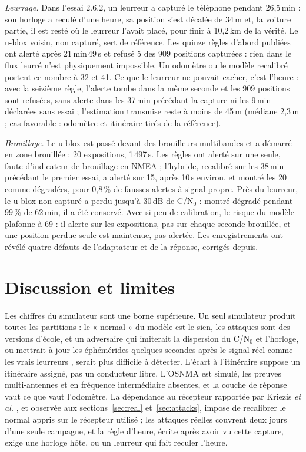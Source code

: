 \documentclass[conference]{IEEEtran}
\begin{document}
\emph{Leurrage.} Dans l'essai 2.6.2, un leurreur a capturé le téléphone pendant 26,5\,min : son horloge a reculé d'une heure, sa position s'est décalée de 34\,m et, la voiture partie, il est resté où le leurreur l'avait placé, pour finir à 10,2\,km de la vérité. Le u-blox voisin, non capturé, sert de référence. Les quinze règles d'abord publiées ont alerté après 21\,min\,49\,s et refusé 5 des 909 positions capturées : rien dans le flux leurré n'est physiquement impossible. Un odomètre ou le modèle recalibré portent ce nombre à 32 et 41. Ce que le leurreur ne pouvait cacher, c'est l'heure : avec la seizième règle, l'alerte tombe dans la même seconde et les 909 positions sont refusées, sans alerte dans les 37\,min précédant la capture ni les 9\,min déclarées sans essai ; l'estimation transmise reste à moins de 45\,m (médiane 2,3\,m ; cas favorable : odomètre et itinéraire tirés de la référence).

\emph{Brouillage.} Le u-blox est passé devant des brouilleurs multibandes et a démarré en zone brouillée : 20 expositions, 1\,497\,s. Les règles ont alerté sur une seule, faute d'indicateur de brouillage en NMEA ; l'hybride, recalibré sur les 38\,min précédant le premier essai, a alerté sur 15, après 10\,s environ, et montré les 20 comme dégradées, pour 0,8\,\% de fausses alertes à signal propre. Près du leurreur, le u-blox non capturé a perdu jusqu'à 30\,dB de C/N$_0$ : montré dégradé pendant 99\,\% de 62\,min, il a été conservé. Avec si peu de calibration, le risque du modèle plafonne à 69 : il alerte sur les expositions, pas sur chaque seconde brouillée, et une position perdue seule est maintenue, pas alertée. Les enregistrements ont révélé quatre défauts de l'adaptateur et de la réponse, corrigés depuis.

\section{Discussion et limites}\label{sec:discussion}
Les chiffres du simulateur sont une borne supérieure. Un seul simulateur produit toutes les partitions : le « normal » du modèle est le sien, les attaques sont des versions d'école, et un adversaire qui imiterait la dispersion du C/N$_0$ et l'horloge, ou mettrait à jour les éphémérides quelques secondes après le signal réel comme les vrais leurreurs \cite{kriezis2025}, serait plus difficile à détecter. L'écart à l'itinéraire suppose un itinéraire assigné, pas un conducteur libre. L'OSNMA est simulé, les preuves multi-antennes et en fréquence intermédiaire absentes, et la couche de réponse vaut ce que vaut l'odomètre. La dépendance au récepteur rapportée par Kriezis \emph{et al.} \cite{kriezis2025}, et observée aux sections~\ref{sec:real} et~\ref{sec:attacks}, impose de recalibrer le normal appris sur le récepteur utilisé ; les attaques réelles couvrent deux jours d'une seule campagne, et la règle d'heure, écrite après avoir vu cette capture, exige une horloge hôte, ou un leurreur qui fait reculer l'heure.
\end{document}

